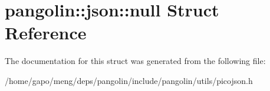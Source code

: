 \hypertarget{structpangolin_1_1json_1_1null}{}\section{pangolin\+:\+:json\+:\+:null Struct Reference}
\label{structpangolin_1_1json_1_1null}


The documentation for this struct was generated from the following file\+:\begin{DoxyCompactItemize}
\item 
/home/gapo/meng/deps/pangolin/include/pangolin/utils/picojson.\+h\end{DoxyCompactItemize}
